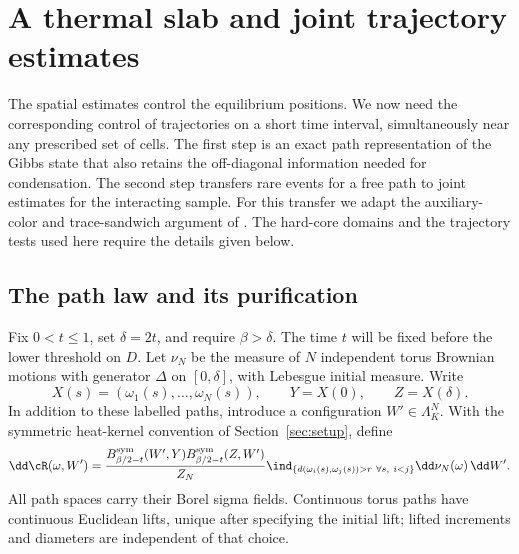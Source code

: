 \section{A thermal slab and joint trajectory estimates}\label{sec:slab}

The spatial estimates control the equilibrium positions.  We now need
the corresponding control of trajectories on a short time interval,
simultaneously near any prescribed set of cells.  The first step is an
exact path representation of the Gibbs state that also retains the
off-diagonal information needed for condensation.  The second step
transfers rare events for a free path to joint estimates for the
interacting sample.  For this transfer we adapt the auxiliary-color
and trace-sandwich argument of \citet[Section ``A joint bound for
atypical trajectories,'' in particular the lemma ``Trace bound for a
Lipschitz sandwich'']{B}.  The hard-core domains and the trajectory
tests used here require the details given below.

\subsection{The path law and its purification}

Fix $0<t\le1$, set $\delta=2t$, and require $\beta>\delta$.
The time $t$ will be fixed before the lower threshold on $D$.
Let $\nu_N$ be the measure of $N$ independent torus Brownian motions
with generator $\Delta$ on $[0,\delta]$, with Lebesgue initial
measure.  Write
\[
 X(s)=(\omega_1(s),\ldots,\omega_N(s)),\qquad
 Y=X(0),\qquad Z=X(\delta).
\]
In addition to these labelled paths, introduce a configuration
$W'\in\Lambda_K^N$.  With the symmetric heat-kernel convention of
Section~\ref{sec:setup}, define
\begin{equation}\label{eq:thermal-slab-law}
 \dd\cR(\omega,W')=
 \frac{B_{\beta/2-t}^{\rm sym}(W',Y)
       B_{\beta/2-t}^{\rm sym}(Z,W')}{Z_N}
 \ind_{\{d(\omega_i(s),\omega_j(s))>r\ \forall s,\ i<j\}}
 \dd\nu_N(\omega)\,\dd W'.
\end{equation}
All path spaces carry their Borel sigma fields.  Continuous torus
paths have continuous Euclidean lifts, unique after specifying the
initial lift; lifted increments and diameters are independent of that
choice.

